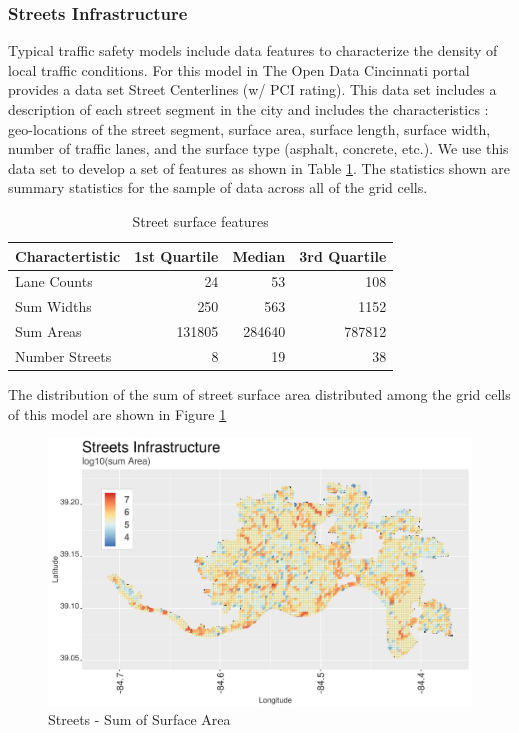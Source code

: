 \documentclass{llncs}
\begin{document}

\subsubsection{Streets Infrastructure}

Typical traffic safety models include data features to characterize the density of local traffic conditions. For this model in The Open Data Cincinnati portal provides a data set Street Centerlines (w/ PCI rating). This data set includes a description of each street segment in the city and includes the characteristics : geo-locations of the street segment, surface area, surface length, surface width, number of traffic lanes, and the surface type (asphalt, concrete, etc.). We use this data set to develop a set of features as shown in Table \ref{table : streetFeatures}. The statistics shown are summary statistics for the sample of data across all of the grid cells.

\FloatBarrier
\begin{table}[!h]
\begin{center}
\caption{Street surface features}
\label{table : streetFeatures}
\begin{tabular}{lrrr}
\hline
\rule{0pt}{12pt}
Charactertistic	&	1st Quartile	&	Median	&	3rd Quartile	\\[2pt]
\hline
Lane Counts	&	24	&	53	&	108	\\
Sum Widths	&	250	&	563	&	1152	\\
Sum Areas	&	131805	&	284640	&	787812	\\
Number Streets	&	8	&	19	&	38	\\[2pt]
\hline
\end{tabular}
\end{center}
\end{table}
\FloatBarrier
%


The distribution of the sum of street surface area distributed among the grid cells of this model are shown in Figure \ref{figure : streetsSumArea}

\FloatBarrier
\begin{figure}
 	\includegraphics[width=\textwidth, height=\textheight, keepaspectratio]{streetsSumArea}
 	\caption{Streets - Sum of Surface Area}
	\label{figure : streetsSumArea}
\end{figure}
\FloatBarrier
\end{document}
